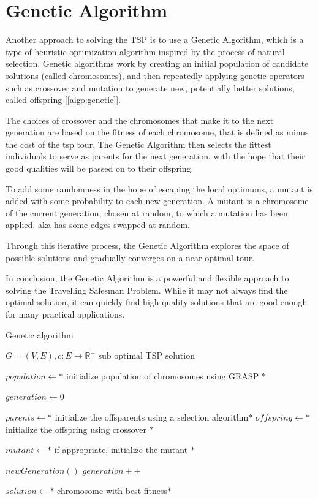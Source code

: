 	




\section{Genetic Algorithm}
Another approach to solving the TSP is to use a Genetic Algorithm, which is a type of heuristic optimization algorithm inspired by the process of natural selection. Genetic algorithms work by creating an initial population of candidate solutions (called chromosomes), and then repeatedly applying genetic operators such as crossover and mutation to generate new, potentially better solutions, called offspring [\ref{algo:genetic}].


The choices of crossover and the chromosomes that make it to the next generation are based on the fitness of each chromosome, that is defined as minus the cost of the tsp tour. The Genetic Algorithm then selects the fittest individuals to serve as parents for the next generation, with the hope that their good qualities will be passed on to their offspring.

To add some randomness in the hope of escaping the local optimums, a mutant is added with some probability to each new generation. A mutant is a chromosome of the current generation, chosen at random, to which a mutation has been applied, aka has some edges swapped at random.

Through this iterative process, the Genetic Algorithm explores the space of possible solutions and gradually converges on a near-optimal tour.

In conclusion, the Genetic Algorithm is a powerful and flexible approach to solving the Travelling Salesman Problem. While it may not always find the optimal solution, it can quickly find high-quality solutions that are good enough for many practical applications.

\begin{algorithm}
    \caption{Genetic algorithm}\label{algo:genetic}
    \begin{algorithmic}[1]
    \Require $G = (V,E), c:E \to \mathbb{R}^+$
    \Ensure $\text{sub optimal TSP solution}$
    
    \State $population \gets *$ initialize population of chromosomes using GRASP $*$

    \State $ generation \gets 0$


        \State $parents \gets *$ initialize the offsparents  using a selection algorithm$*$
        \State $offspring \gets *$ initialize the offspring using crossover $*$

        \State $mutant \gets *$ if appropriate, initialize the mutant $*$

        \State $ newGeneration() $
        \State $ generation++ $

    \EndWhile

    \State $ solution \gets *$ chromosome with best fitness$*$

    

    \end{algorithmic}
\end{algorithm}

